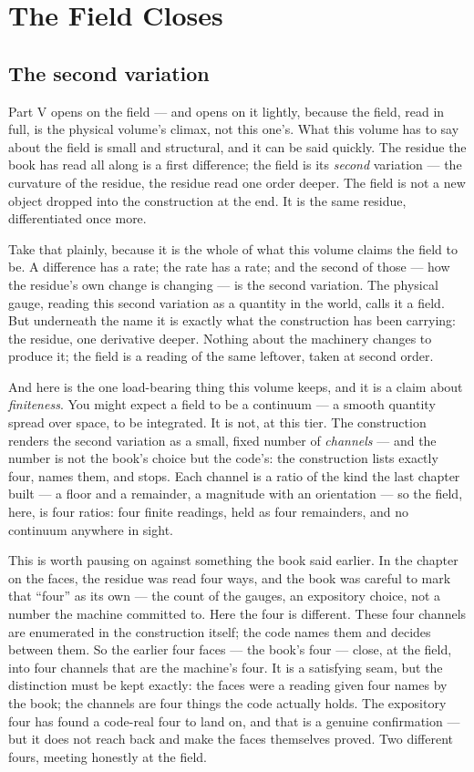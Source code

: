 \chapter{The Field Closes}

\section{The second variation}

Part V opens on the field --- and opens on it lightly, because the field, read in full, is the physical volume's
climax, not this one's. What this volume has to say about the field is small and structural, and it can be said
quickly. The residue the book has read all along is a first difference; the field is its \emph{second} variation ---
the curvature of the residue, the residue read one order deeper. The field is not a new object dropped into the
construction at the end. It is the same residue, differentiated once more.

Take that plainly, because it is the whole of what this volume claims the field to be. A difference has a rate; the
rate has a rate; and the second of those --- how the residue's own change is changing --- is the second variation. The
physical gauge, reading this second variation as a quantity in the world, calls it a field. But underneath the name it
is exactly what the construction has been carrying: the residue, one derivative deeper. Nothing about the machinery
changes to produce it; the field is a reading of the same leftover, taken at second order.

And here is the one load-bearing thing this volume keeps, and it is a claim about \emph{finiteness}. You might expect a
field to be a continuum --- a smooth quantity spread over space, to be integrated. It is not, at this tier. The
construction renders the second variation as a small, fixed number of \emph{channels} --- and the number is not the
book's choice but the code's: the construction lists exactly four, names them, and stops. Each channel is a ratio of
the kind the last chapter built --- a floor and a remainder, a magnitude with an orientation --- so the field, here, is
four ratios: four finite readings, held as four remainders, and no continuum anywhere in sight.

This is worth pausing on against something the book said earlier. In the chapter on the faces, the residue was read
four ways, and the book was careful to mark that ``four'' as its own --- the count of the gauges, an expository choice,
not a number the machine committed to. Here the four is different. These four channels are enumerated in the
construction itself; the code names them and decides between them. So the earlier four faces --- the book's four ---
close, at the field, into four channels that are the machine's four. It is a satisfying seam, but the distinction must
be kept exactly: the faces were a reading given four names by the book; the channels are four things the code actually
holds. The expository four has found a code-real four to land on, and that is a genuine confirmation --- but it does not
reach back and make the faces themselves proved. Two different fours, meeting honestly at the field.

